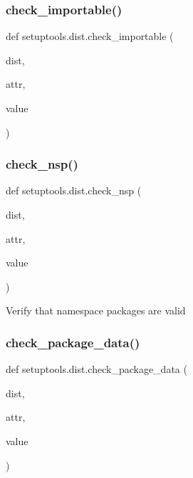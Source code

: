 \subsubsection{\texorpdfstring{check\+\_\+importable()}{check\_importable()}}
{\footnotesize\ttfamily def setuptools.\+dist.\+check\+\_\+importable (\begin{DoxyParamCaption}\item[{}]{dist,  }\item[{}]{attr,  }\item[{}]{value }\end{DoxyParamCaption})}

\mbox{\label{namespacesetuptools_1_1dist_a328a9faed0ff4a67c79bf755bb8aa9c5}} 
\subsubsection{\texorpdfstring{check\+\_\+nsp()}{check\_nsp()}}
{\footnotesize\ttfamily def setuptools.\+dist.\+check\+\_\+nsp (\begin{DoxyParamCaption}\item[{}]{dist,  }\item[{}]{attr,  }\item[{}]{value }\end{DoxyParamCaption})}

\begin{DoxyVerb}Verify that namespace packages are valid\end{DoxyVerb}
 \mbox{\label{namespacesetuptools_1_1dist_a1c396158f859904995bff0393651fe59}} 
\subsubsection{\texorpdfstring{check\+\_\+package\+\_\+data()}{check\_package\_data()}}
{\footnotesize\ttfamily def setuptools.\+dist.\+check\+\_\+package\+\_\+data (\begin{DoxyParamCaption}\item[{}]{dist,  }\item[{}]{attr,  }\item[{}]{value }\end{DoxyParamCaption})}

